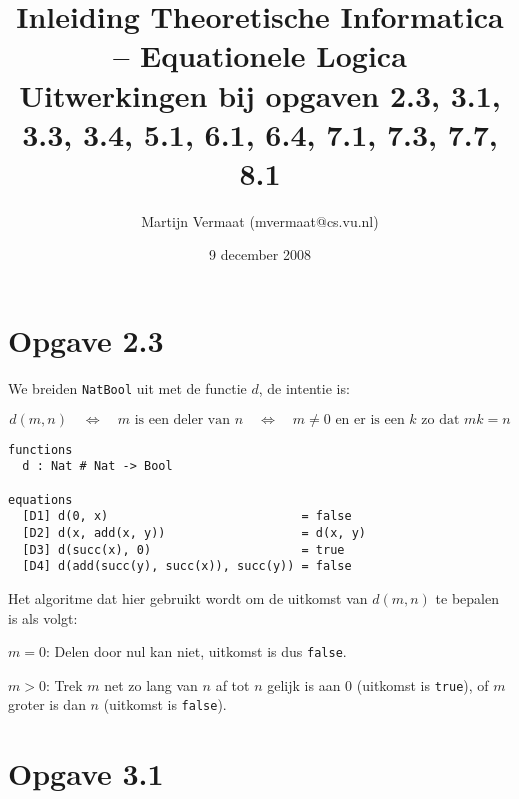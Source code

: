 \documentclass[a4paper,11pt]{article}
\title{Inleiding Theoretische Informatica -- Equationele Logica\\
\normalsize{Uitwerkingen bij opgaven 2.3, 3.1, 3.3, 3.4, 5.1, 6.1, 6.4, 7.1, 7.3, 7.7, 8.1}}
\author{Martijn Vermaat (mvermaat@cs.vu.nl)}
\date{9 december 2008}
\begin{document}
\maketitle


\section*{Opgave 2.3}

We breiden \verb|NatBool| uit met de functie $d$, de intentie is:

\begin{displaymath}
d(m, n) \quad \Longleftrightarrow \quad \mbox{$m$ is een deler van $n$} \quad \Longleftrightarrow \quad \mbox{$m \neq 0$ en er is een $k$ zo dat $m k
= n$}
\end{displaymath}

\begin{verbatim}
functions
  d : Nat # Nat -> Bool

equations
  [D1] d(0, x)                           = false
  [D2] d(x, add(x, y))                   = d(x, y)
  [D3] d(succ(x), 0)                     = true
  [D4] d(add(succ(y), succ(x)), succ(y)) = false
\end{verbatim}

Het algoritme dat hier gebruikt wordt om de uitkomst van $d(m, n)$ te
bepalen is als volgt:

\begin{description}

\item{$m=0$:}
Delen door nul kan niet, uitkomst is dus \verb|false|.

\item{$m>0$:}
Trek $m$ net zo lang van $n$ af tot $n$ gelijk is aan $0$ (uitkomst is
\verb|true|), of $m$ groter is dan $n$ (uitkomst is \verb|false|).

\end{description}


\section*{Opgave 3.1}
\end{document}
